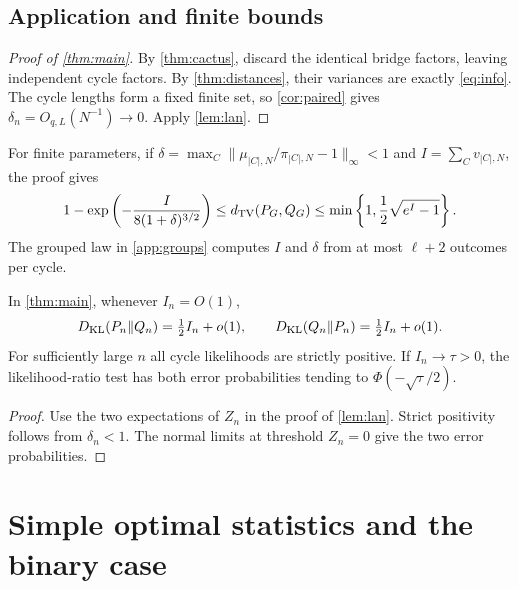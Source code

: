 \subsection{Application and finite bounds}
\begin{proof}[Proof of \cref{thm:main}]
By \cref{thm:cactus}, discard the identical bridge factors, leaving independent
cycle factors. By \cref{thm:distances}, their variances are exactly
\eqref{eq:info}. The cycle lengths form a fixed finite set, so
\cref{cor:paired} gives $\delta_n=O_{q,L}(N^{-1})\to0$.
Apply \cref{lem:lan}.
\end{proof}

For finite parameters, if
$\delta=\max_C\|\mu_{|C|,N}/\pi_{|C|,N}-1\|_\infty<1$ and
$I=\sum_Cv_{|C|,N}$, the proof gives
\begin{equation}\label{eq:finite-bounds}
1-\exp\left(-\frac I{8(1+\delta)^{3/2}}\right)
\le d_{\mathrm{TV}}(P_G,Q_G)
\le\min\left\{1,\frac12\sqrt{e^I-1}\right\}.
\end{equation}
The grouped law in \cref{app:groups} computes $I$ and $\delta$ from at most
$\ell+2$ outcomes per cycle.

\begin{corollary}\label{cor:information}
In \cref{thm:main}, whenever $I_n=O(1)$,
\[
D_{\mathrm{KL}}(P_n\Vert Q_n)=\tfrac12 I_n+o(1),\qquad
D_{\mathrm{KL}}(Q_n\Vert P_n)=\tfrac12 I_n+o(1).
\]
For sufficiently large $n$ all cycle likelihoods are strictly positive.
If $I_n\to\tau>0$, the likelihood-ratio test has both error probabilities
tending to $\Phi(-\sqrt\tau/2)$.
\end{corollary}
\begin{proof}
Use the two expectations of $Z_n$ in the proof of \cref{lem:lan}.
Strict positivity follows from $\delta_n<1$. The normal limits at threshold
$Z_n=0$ give the two error probabilities.
\end{proof}

\section{Simple optimal statistics and the binary case}\label{sec:statistics}

